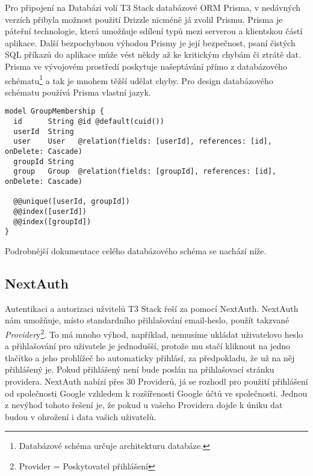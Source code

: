 Pro připojení na Databázi volí T3 Stack databázové ORM Prisma, v nedávných verzích přibyla možnost použití Drizzle nicméně já zvolil Prismu. Prisma je páteřní technologie, která umožňuje sdílení typů mezi serverou a klientskou částí aplikace. Další bezpochybnou výhodou Prismy je její bezpečnost, psaní čistých SQL příkazů do aplikace může vést někdy až ke kritickým chybám či ztrátě dat. Prisma ve vývojovém prostředí poskytuje našeptávání přímo z databázového schématu\footnote{Databázové schéma určuje architekturu databáze.} a tak je mnohem těžší udělat chyby.
Pro design databázového schématu používá Prisma vlastní jazyk.

\begin{lstlisting}[language=Prisma, caption={Úryvek z Databázové schématu zobrazující strukturu tabulky pro členství ve skupině}]
model GroupMembership {
  id      String @id @default(cuid())
  userId  String
  user    User   @relation(fields: [userId], references: [id], onDelete: Cascade)
  groupId String
  group   Group  @relation(fields: [groupId], references: [id], onDelete: Cascade)

  @@unique([userId, groupId])
  @@index([userId])
  @@index([groupId])
}
\end{lstlisting}
Podrobnější dokumentace celého databázového schéma se nachází níže.

\subsection{NextAuth}
Autentikaci a autorizaci užvitelů T3 Stack řeší za pomocí NextAuth. NextAuth nám umožňuje, místo standardního přihlašování email-heslo, použít takzvané \textit{Provider}y\footnote{Provider = Poskytovatel přihlášení}.
To má mnoho výhod, například, nemusíme ukládat uživatelovo heslo a přihlašování pro uživatele je jednodušší, protože mu stačí kliknout na jedno tlačítko a jeho prohlížeč ho automaticky přihlásí, za předpokladu, že už na něj přihlášený je.
Pokud přihlášený není bude poslán na přihlašovací stránku providera. NextAuth nabízí přes 30 Providerů\cite{next-auth}, já se rozhodl pro použití přihlášení od společnosti Google vzhledem k rozšířenosti Google účtů ve společnosti. Jednou z nevýhod tohoto řešení je, že pokud u vašeho Providera dojde k úniku dat budou v ohrožení i data vašich uživatelů.

